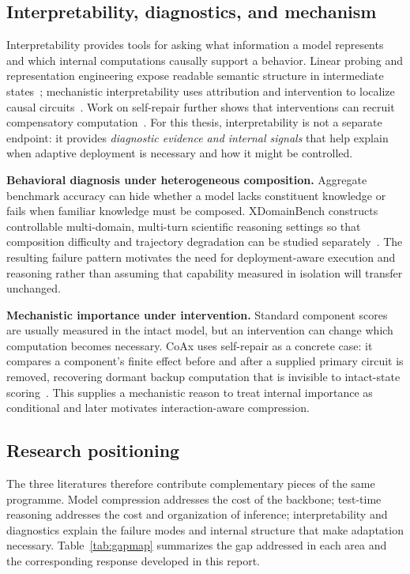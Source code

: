 \documentclass[12pt,a4paper]{article}
\newcommand{\method}[1]{{\sffamily\bfseries\color{MethodBlue}#1}}
\newcommand{\XDB}{\method{XDomainBench}}
\newcommand{\SubspacePath}{\method{SubspacePath Pruner}}
\newcommand{\CoAx}{\method{CoAx}}
\def\method#1{#1}\def\XDB{XDomainBench}\def\SubspacePath{SubspacePath Pruner}%
\begin{document}
\subsection{Interpretability, diagnostics, and mechanism}
Interpretability provides tools for asking what information a model represents and which internal computations causally support a behavior. Linear probing and representation engineering expose readable semantic structure in intermediate states~\citep{alain2016understanding,belinkov2022probing,zou2023representationengineering}; mechanistic interpretability uses attribution and intervention to localize causal circuits~\citep{elhage2021framework,wang2022ioi,conmy2023acdc,kramar2024atp}. Work on self-repair further shows that interventions can recruit compensatory computation~\citep{mcgrath2023hydra,rushing2024selfrepair}. For this thesis, interpretability is not a separate endpoint: it provides \emph{diagnostic evidence and internal signals} that help explain when adaptive deployment is necessary and how it might be controlled.

\textbf{Behavioral diagnosis under heterogeneous composition.} Aggregate benchmark accuracy can hide whether a model lacks constituent knowledge or fails when familiar knowledge must be composed. \XDB{} constructs controllable multi-domain, multi-turn scientific reasoning settings so that composition difficulty and trajectory degradation can be studied separately~\citep{gong2026xdomainbench}. The resulting failure pattern motivates the need for deployment-aware execution and reasoning rather than assuming that capability measured in isolation will transfer unchanged.

\textbf{Mechanistic importance under intervention.} Standard component scores are usually measured in the intact model, but an intervention can change which computation becomes necessary. \CoAx{} uses self-repair as a concrete case: it compares a component's finite effect before and after a supplied primary circuit is removed, recovering dormant backup computation that is invisible to intact-state scoring~\citep{gong2026coax}. This supplies a mechanistic reason to treat internal importance as conditional and later motivates interaction-aware compression.

\subsection{Research positioning}
The three literatures therefore contribute complementary pieces of the same programme. Model compression addresses the cost of the backbone; test-time reasoning addresses the cost and organization of inference; interpretability and diagnostics explain the failure modes and internal structure that make adaptation necessary. Table~\ref{tab:gapmap} summarizes the gap addressed in each area and the corresponding response developed in this report.
\end{document}
